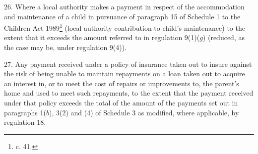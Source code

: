 \documentclass[12pt,a4paper]{article}
\begin{document}

\medskip

26.  Where a local authority makes a payment in respect of the accommodation and maintenance of a child in pursuance of paragraph 15 of Schedule 1 to the Children Act 1989\footnote{ c. 41.} (local authority contribution to child’s maintenance) to the extent that it exceeds the amount referred to in 
regulation 9(1)($g$) %
(reduced, as the case may be, under regulation 9(4)).


\medskip

27.  Any payment received under a policy of insurance taken out to insure against the risk of being unable to maintain repayments on a loan taken out to acquire an interest in, or to meet the cost of repairs or improvements to, the parent’s home and used to meet such repayments, to the extent that the payment received under that policy 
exceeds  %
%
%
the total of the amount of the payments set out in paragraphs 1($b$), 3(2) and (4) of Schedule 3 as modified, where applicable, by regulation 18.  %

\end{document}
